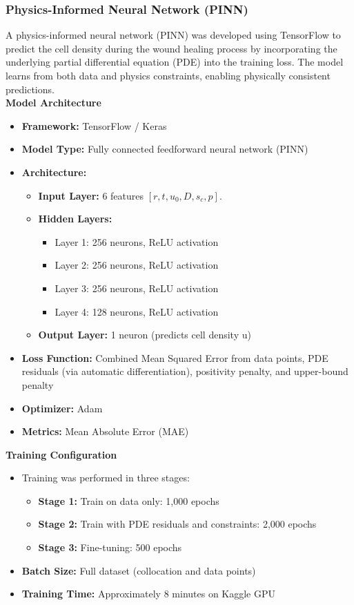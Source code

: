 \documentclass[conference]{IEEEtran}
\begin{document}
\subsubsection{\textbf{Physics-Informed Neural Network (PINN)}}
A physics-informed neural network (PINN) was developed using TensorFlow to predict the cell density during the wound healing process by incorporating the underlying partial differential equation (PDE) into the training loss. The model learns from both data and physics constraints, enabling physically consistent predictions.\\
\textbf{Model Architecture}
\begin{itemize}
    \item \textbf{Framework:} TensorFlow / Keras
    \item \textbf{Model Type:} Fully connected feedforward neural network (PINN)
    \item \textbf{Architecture:}  
    \begin{itemize}
        \item \textbf{Input Layer:} 6 features $[r, t, u_0, D, s_c, p]$.
        \item \textbf{Hidden Layers:}
        \begin{itemize}
            \item Layer 1: 256 neurons, ReLU activation
            \item Layer 2: 256 neurons, ReLU activation
            \item Layer 3: 256 neurons, ReLU activation
            \item Layer 4: 128 neurons, ReLU activation
        \end{itemize}
        \item \textbf{Output Layer:} 1 neuron (predicts cell density u)
    \end{itemize}
    \item \textbf{Loss Function:} Combined Mean Squared Error from data points, PDE residuals (via automatic differentiation), positivity penalty, and upper-bound penalty
    \item \textbf{Optimizer:} Adam
    \item \textbf{Metrics:} Mean Absolute Error (MAE)
\end{itemize}
\textbf{Training Configuration} 
\begin{itemize}
    \item Training was performed in three stages:
        \begin{itemize}
        \item \textbf{Stage 1:} Train on data only: 1,000 epochs
        \item \textbf{Stage 2:} Train with PDE residuals and constraints: 2,000 epochs
        \item \textbf{Stage 3:} Fine-tuning: 500 epochs
        \end{itemize}
    \item \textbf{Batch Size:} Full dataset (collocation and data points)
    \item \textbf{Training Time:} Approximately 8 minutes on Kaggle GPU
\end{itemize}
\end{document}
